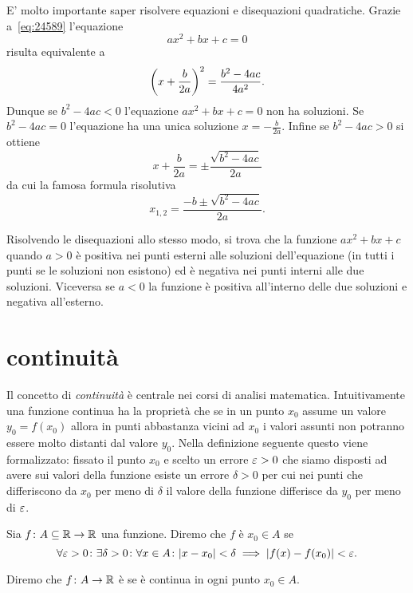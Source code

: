 E' molto importante saper risolvere equazioni e disequazioni
quadratiche. Grazie a~\eqref{eq:24589} l'equazione
\[
 a x^2 + bx + c = 0
\]
risulta equivalente a
\[
  {\left( x+\frac{b}{2a} \right)}^2 = \frac{b^2-4ac}{4a^2}.
\]
Dunque se $b^2-4ac<0$ l'equazione $ax^2+bx+c=0$ non ha soluzioni.
Se $b^2-4ac=0$ l'equazione ha una unica soluzione $x=-\frac{b}{2a}$.
Infine se $b^2-4ac>0$ si ottiene
\[
  x+\frac b{2a} = \pm \frac{\sqrt{b^2-4ac}}{2a}
\]
da cui la famosa formula risolutiva
\mymark{***}
\begin{equation}\label{eq:secondo_grado}
  x_{1,2} = \frac{-b \pm \sqrt{b^2-4ac}}{2a}.
\end{equation}

Risolvendo le disequazioni allo stesso modo, si trova
che la funzione $ax^2+bx+c$ quando $a>0$ è positiva
nei punti esterni alle soluzioni dell'equazione
(in tutti i punti se le soluzioni non esistono) ed
è negativa nei punti interni alle due soluzioni.
Viceversa se $a<0$ la funzione è positiva all'interno
delle due soluzioni e negativa all'esterno.

\section{continuità}
\label{sec:continuita}

Il concetto di \emph{continuità} è centrale
nei corsi di analisi matematica.
Intuitivamente una funzione continua ha la proprietà
che se in un punto $x_0$ assume un valore $y_0=f(x_0)$ allora
in punti abbastanza vicini ad $x_0$ i valori assunti
non potranno essere molto distanti dal valore $y_0$.
Nella definizione seguente questo viene formalizzato:
fissato il punto $x_0$ e scelto un errore $\varepsilon>0$
che siamo disposti ad avere sui valori della funzione
esiste un errore $\delta>0$ per cui nei punti
che differiscono da $x_0$ per meno di $\delta$ il valore
della funzione differisce da $y_0$ per meno di $\varepsilon$.

\begin{definition}[continuità su $\RR$]
\label{def:continua}%
%
%
Sia $f\colon A \subseteq \mathbb R \to \mathbb R$ una funzione. Diremo che
$f$ è  $x_0\in A$ se
\begin{equation}\label{eq:continuita}
\forall \varepsilon>0 \colon \exists \delta>0 \colon
\forall x\in A\colon
{\left|x-x_0\right|} < \delta \implies {\left|f(x)-f(x_0)\right|} < \varepsilon.
\end{equation}

Diremo che $f\colon A \to \mathbb R$ è  se è continua
in ogni punto $x_0 \in A$.
\end{definition}

